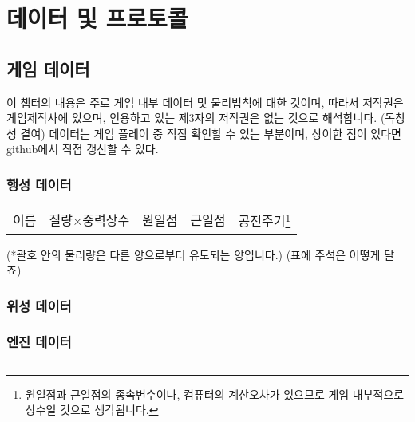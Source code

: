 \part{데이터 및 프로토콜}
\chapter{게임 데이터}
이 챕터의 내용은 주로 게임 내부 데이터 및 물리법칙에 대한 것이며, 
따라서 저작권은 게임제작사에 있으며, 인용하고 있는 제3자의 저작권은 없는 것으로 해석합니다. (독창성 결여)
데이터는 게임 플레이 중 직접 확인할 수 있는 부분이며, 상이한 점이 있다면 github에서 직접 갱신할 수 있다.

\section{행성 데이터}
\begin{tabular}{|l|r|r|r|r|}
\hline
이름&질량$\times$중력상수&원일점&근일점&공전주기\footnote{원일점과 근일점의 종속변수이나, 컴퓨터의 계산오차가 있으므로 게임 내부적으로 상수일 것으로 생각됩니다.}
\end{tabular}
(*괄호 안의 물리량은 다른 양으로부터 유도되는 양입니다.)
(표에 주석은 어떻게 달죠)
\section{위성 데이터}
\section{엔진 데이터}

\chapter{}